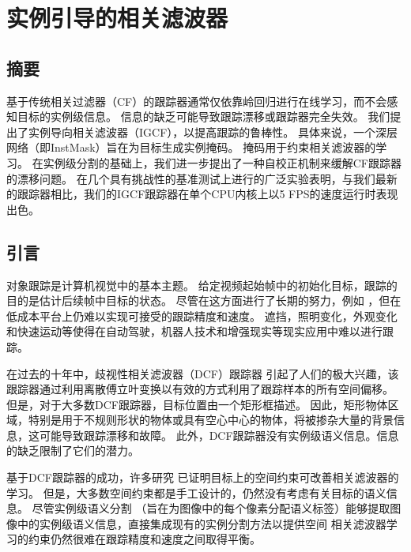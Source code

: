 \chapter{实例引导的相关滤波器}\label{chap:IGCF}

\section{摘要}
基于传统相关过滤器（CF）的跟踪器通常仅依靠岭回归进行在线学习，而不会感知目标的实例级信息。 信息的缺乏可能导致跟踪漂移或跟踪器完全失效。 我们提出了实例导向相关滤波器（IGCF），以提高跟踪的鲁棒性。 具体来说，一个深层网络（即InstMask）旨在为目标生成实例掩码。 掩码用于约束相关滤波器的学习。 在实例级分割的基础上，我们进一步提出了一种自校正机制来缓解CF跟踪器的漂移问题。 在几个具有挑战性的基准测试上进行的广泛实验表明，与我们最新的跟踪器相比，我们的IGCF跟踪器在单个CPU内核上以5 FPS的速度运行时表现出色。

\section{引言}
对象跟踪是计算机视觉中的基本主题。 给定视频起始帧中的初始化目标，跟踪的目的是估计后续帧中目标的状态。 尽管在这方面进行了长期的努力，例如 \cite{Leang2018OnlineFO, Wang2019VisualOT, Zhang2018UsingFL}，但在低成本平台上仍难以实现可接受的跟踪精度和速度。 遮挡，照明变化，外观变化和快速运动等使得在自动驾驶，机器人技术和增强现实等现实应用中难以进行跟踪。

在过去的十年中，歧视性相关滤波器（DCF）跟踪器 \cite{bolme2010visual, Zhang2018VisualTU} 引起了人们的极大兴趣，该跟踪器通过利用离散傅立叶变换以有效的方式利用了跟踪样本的所有空间偏移。 但是，对于大多数DCF跟踪器，目标位置由一个矩形框描述。 因此，矩形物体区域，特别是用于不规则形状的物体或具有空心中心的物体，将被掺杂大量的背景信息，这可能导致跟踪漂移和故障。 此外，DCF跟踪器没有实例级语义信息。信息的缺乏限制了它们的潜力。

基于DCF跟踪器的成功，许多研究 \cite{Danelljan2015LearningSR, Lukezic2017DiscriminativeCF} 已证明目标上的空间约束可改善相关滤波器的学习。 但是，大多数空间约束都是手工设计的，仍然没有考虑有关目标的语义信息。 尽管实例级语义分割 \cite{Pinheiro2015LearningTS, Zhang2019ProgressivelyDN}（旨在为图像中的每个像素分配语义标签）能够提取图像中的实例级语义信息，直接集成现有的实例分割方法以提供空间 相关滤波器学习的约束仍然很难在跟踪精度和速度之间取得平衡。

